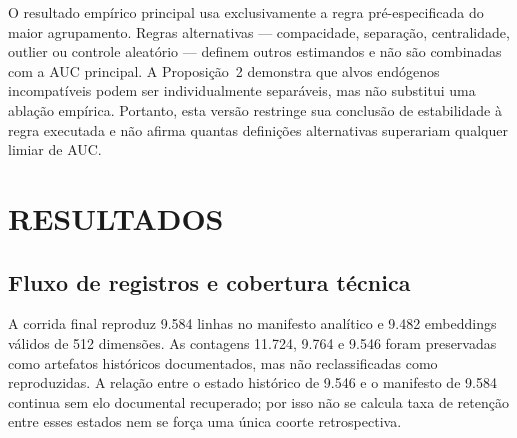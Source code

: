 O resultado empírico principal usa exclusivamente a regra pré-especificada do maior agrupamento. Regras alternativas --- compacidade, separação, centralidade, outlier ou controle aleatório --- definem outros estimandos e não são combinadas com a AUC principal. A Proposição~2 demonstra que alvos endógenos incompatíveis podem ser individualmente separáveis, mas não substitui uma ablação empírica. Portanto, esta versão restringe sua conclusão de estabilidade à regra executada e não afirma quantas definições alternativas superariam qualquer limiar de AUC.

\chapter{RESULTADOS}

\section{Fluxo de registros e cobertura técnica}

A corrida final reproduz 9.584 linhas no manifesto analítico e 9.482 embeddings válidos de 512 dimensões. As contagens 11.724, 9.764 e 9.546 foram preservadas como artefatos históricos documentados, mas não reclassificadas como reproduzidas. A relação entre o estado histórico de 9.546 e o manifesto de 9.584 continua sem elo documental recuperado; por isso não se calcula taxa de retenção entre esses estados nem se força uma única coorte retrospectiva.


